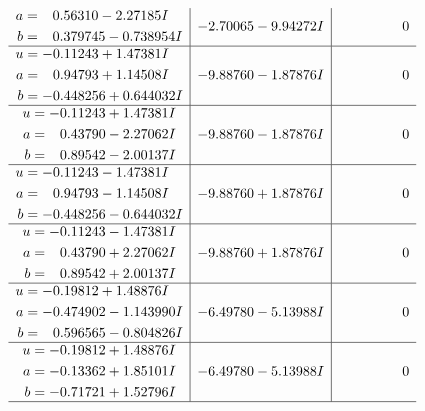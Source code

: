 \documentclass[1p]{elsarticle_modified}
\theoremstyle{definition}
\begin{document}
$$\begin{array}{c|c|c}
\begin{aligned}
a &= \phantom{-}0.56310 - 2.27185 I \\
b &= \phantom{-}0.379745 - 0.738954 I\end{aligned}
 & -2.70065 - 9.94272 I & \phantom{-0.000000 } 0 \\ \hline\begin{aligned}
u &= -0.11243 + 1.47381 I \\
a &= \phantom{-}0.94793 + 1.14508 I \\
b &= -0.448256 + 0.644032 I\end{aligned}
 & -9.88760 - 1.87876 I & \phantom{-0.000000 } 0 \\ \hline\begin{aligned}
u &= -0.11243 + 1.47381 I \\
a &= \phantom{-}0.43790 - 2.27062 I \\
b &= \phantom{-}0.89542 - 2.00137 I\end{aligned}
 & -9.88760 - 1.87876 I & \phantom{-0.000000 } 0 \\ \hline\begin{aligned}
u &= -0.11243 - 1.47381 I \\
a &= \phantom{-}0.94793 - 1.14508 I \\
b &= -0.448256 - 0.644032 I\end{aligned}
 & -9.88760 + 1.87876 I & \phantom{-0.000000 } 0 \\ \hline\begin{aligned}
u &= -0.11243 - 1.47381 I \\
a &= \phantom{-}0.43790 + 2.27062 I \\
b &= \phantom{-}0.89542 + 2.00137 I\end{aligned}
 & -9.88760 + 1.87876 I & \phantom{-0.000000 } 0 \\ \hline\begin{aligned}
u &= -0.19812 + 1.48876 I \\
a &= -0.474902 - 1.143990 I \\
b &= \phantom{-}0.596565 - 0.804826 I\end{aligned}
 & -6.49780 - 5.13988 I & \phantom{-0.000000 } 0 \\ \hline\begin{aligned}
u &= -0.19812 + 1.48876 I \\
a &= -0.13362 + 1.85101 I \\
b &= -0.71721 + 1.52796 I\end{aligned}
 & -6.49780 - 5.13988 I & \phantom{-0.000000 } 0\\
 \hline 
 \end{array}$$\newpage$$\begin{array}{c|c|c}  

\end{array}$$
\end{document}
